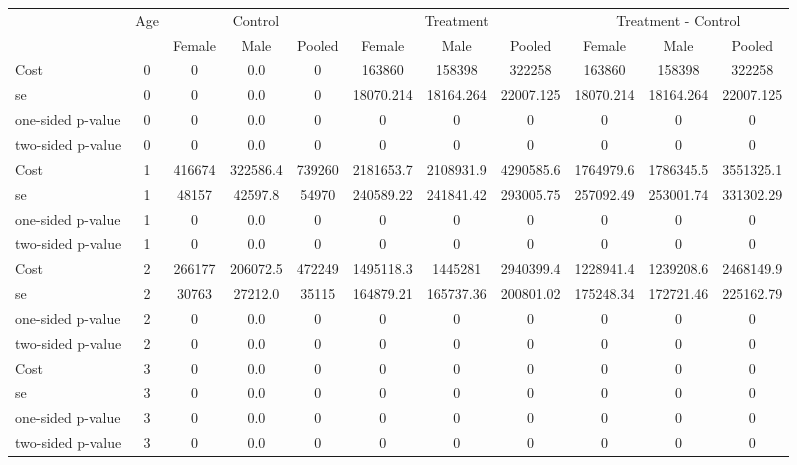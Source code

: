 \begin{tabular}{lcccccccccc} \hline \hline
 &Age & \multicolumn{3}{c}{Control} & \multicolumn{3}{c}{Treatment} & \multicolumn{3}{c}{Treatment - Control} \\ 
& & Female  & Male  & Pooled  & Female  & Male  & Pooled  & Female  & Male  & Pooled  \\  \hline  
Cost 			 &         0 &         0 &       0.0 &         0 & 163860 & 158398 & 322258 & 163860 & 158398 & 322258 \\  
se 				 &         0 &         0 &       0.0 &         0 & 18070.214 & 18164.264 & 22007.125 & 18070.214 & 18164.264 & 22007.125 \\  
one-sided p-value &         0 &         0 &       0.0 &         0 & 0 & 0 & 0 & 0 & 0 & 0 \\  
two-sided p-value &         0 &         0 &       0.0 &         0 & 0 & 0 & 0 & 0 & 0 & 0 \\  
Cost 			  &         1 &    416674 &  322586.4 &    739260 & 2181653.7 & 2108931.9 & 4290585.6 & 1764979.6 & 1786345.5 & 3551325.1 \\  
se 				  &         1 &     48157 &   42597.8 &     54970 & 240589.22 & 241841.42 & 293005.75 & 257092.49 & 253001.74 & 331302.29 \\  
one-sided p-value &         1 &         0 &       0.0 &         0 & 0 & 0 & 0 & 0 & 0 & 0 \\  
two-sided p-value &         1 &         0 &       0.0 &         0 & 0 & 0 & 0 & 0 & 0 & 0 \\  
Cost 			  &         2 &    266177 &  206072.5 &    472249 & 1495118.3 & 1445281 & 2940399.4 & 1228941.4 & 1239208.6 & 2468149.9 \\  
se 				  &         2 &     30763 &   27212.0 &     35115 & 164879.21 & 165737.36 & 200801.02 & 175248.34 & 172721.46 & 225162.79 \\  
one-sided p-value &         2 &         0 &       0.0 &         0 & 0 & 0 & 0 & 0 & 0 & 0 \\  
two-sided p-value &         2 &         0 &       0.0 &         0 & 0 & 0 & 0 & 0 & 0 & 0 \\  
Cost 			  &         3 &         0 &       0.0 &         0 & 0 & 0 & 0 & 0 & 0 & 0 \\  
se 				  &         3 &         0 &       0.0 &         0 & 0 & 0 & 0 & 0 & 0 & 0 \\  
one-sided p-value &         3 &         0 &       0.0 &         0 & 0 & 0 & 0 & 0 & 0 & 0 \\  
two-sided p-value &         3 &         0 &       0.0 &         0 & 0 & 0 & 0 & 0 & 0 & 0 \\  

\end{tabular}

